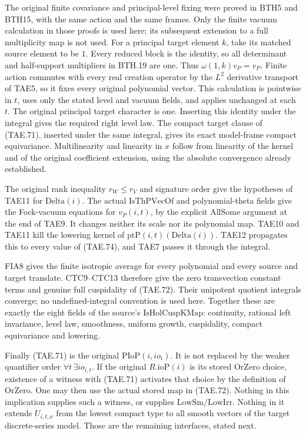 The original finite covariance and principal-level fixing
were proved in BTH5 and BTH15, with the same action and
the same frames.  Only the finite vacuum calculation in
those proofs is used here; its subsequent extension to a
full multiplicity map is not used.  For a principal
target element \(k\), take its matched source element
to be \(1\).  Every reduced block is the identity, so
all determinant and half-support multipliers in
BTH.19 are one.  Thus \(\omega(1,k)v_P=v_P\).
Finite action commutes with every real creation
operator by the \(L^2\) derivative transport of TAE5,
so it fixes every original polynomial vector.
This calculation is pointwise in \(t\), uses only
the stated level and vacuum fields, and applies
unchanged at each \(t\).  The original principal
target character is one.  Inserting this identity under
the integral gives the required right level law.
The compact target clause of (TAE.71), inserted under
the same integral, gives its exact model-frame compact
equivariance.  Multilinearity and linearity in \(x\)
follow from linearity of the kernel and of the original
coefficient extension, using the absolute convergence
already established.

The original rank inequality \(r_W\le r_V\) and signature
order give the hypotheses of TAE11 for
\(\mathrm{Delta}(i)\).  The actual \(\mathrm{IsThPVecOf}\)
and polynomial-theta fields give the Fock-vacuum equations
for \(v_P(i,t)\), by the explicit
\(\mathrm{AllSome}\) argument at the end of TAE9.
It changes neither its scale nor its polynomial map.
TAE10 and TAE11 kill the lowering kernel of
\(\mathrm{ptP}(i,t)(\mathrm{Delta}(i))\).
TAE12 propagates this to every value of (TAE.74), and
TAE7 passes it through the integral.

FIA8 gives the finite isotropic average for every
polynomial and every source and target translate.
CTC9--CTC13 therefore give the zero transvection
constant terms and genuine full cuspidality of
(TAE.72).  Their unipotent quotient integrals converge;
no undefined-integral convention is used here.
Together these are exactly the eight fields
of the source's \(\mathrm{IsHolCuspKMap}\):
continuity, rational left invariance, level law,
smoothness, uniform growth, cuspidality, compact
equivariance and lowering.

Finally (TAE.71) is the original \(\mathrm{PIoP}(i,io_i)\).
It is not replaced by the weaker quantifier order
\(\forall t\,\exists io_{i,t}\).
If the original \(R.\mathrm{ioP}(i)\) is its stored
\(\mathrm{OrZero}\) choice, existence of a witness
with (TAE.71) activates that choice by the definition
of \(\mathrm{OrZero}\).  One may then use the actual
stored map in (TAE.72).
Nothing in this implication supplies such a witness,
or supplies \(\mathrm{LowSm}/\mathrm{LowIrr}\).
Nothing in it extends \(U_{i,t,x}\) from the lowest
compact type to all smooth vectors of the target
discrete-series model.  Those are the remaining
interfaces, stated next.

